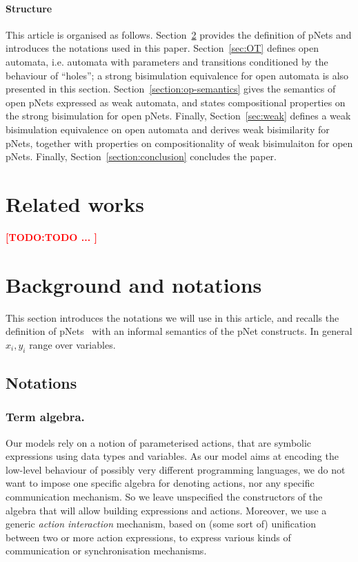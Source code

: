 \documentclass{lncs/llncs}
\newcommand{\TODO}[1]{\textcolor{red}{\textbf{[TODO:#1]}}}
\begin{document}
\paragraph{Structure}
This article is organised as follows. Section~\ref{sec:notations} provides the definition of pNets and introduces the notations used in this paper. Section~\ref{sec:OT} defines open automata, i.e. automata with parameters and transitions conditioned by the behaviour of ``holes''; a strong bisimulation equivalence for open automata is also presented in this section. Section~\ref{section:op-semantics} gives the semantics of open pNets expressed as weak automata, and states compositional properties on the strong bisimulation for open pNets. Finally, Section~\ref{sec:weak} defines a weak bisimulation equivalence on open automata and derives weak bisimilarity for pNets, together with properties on compositionality of weak bisimulaiton for open pNets. Finally, Section~\ref{section:conclusion} concludes the paper.


\section{Related works}

\TODO{TODO ... }

\section{Background and notations}\label{sec:notations}
This section introduces the notations we will use in this article, and  recalls the definition of pNets~\cite{henrio:Forte2016} with an informal semantics  of the pNet constructs.
In general $x_i,y_i$ range over variables.

\subsection{Notations}
\subsubsection*{Term algebra.}
Our models rely on a notion of parameterised actions, that are
symbolic expressions using data types and variables. As our model aims
at encoding the low-level behaviour of possibly very different
programming languages, we do not want to impose one specific algebra
for denoting actions, nor any specific communication mechanism. So we
leave unspecified the constructors of the algebra that will allow building
expressions and actions. Moreover, we use a generic {\em action interaction}
mechanism, based on (some sort of) unification between two or more action
expressions, to express various kinds of communication or
synchronisation mechanisms.
\end{document}

